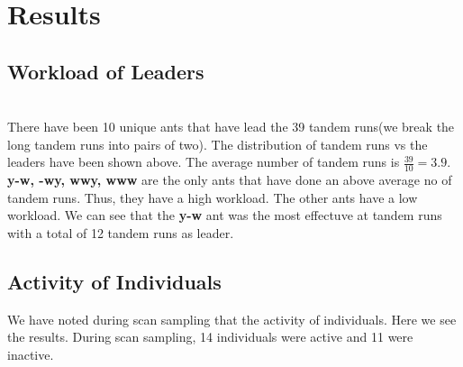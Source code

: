 \documentclass{scrartcl}
\begin{document}
\section{Results}
\subsection{Workload of Leaders}
\\
There have been 10 unique ants that have lead the 39 tandem runs(we break the long tandem runs into 
pairs of two). The distribution of tandem runs vs the leaders have been shown above. The average 
number of tandem runs is \(\frac{39}{10} = 3.9\). \textbf{y-w, -wy, wwy, www} are the only ants that have done 
an above average no of tandem runs. Thus, they have a high workload. The other ants have a low workload. 
We can see that the \textbf{y-w} ant was the most effectuve at tandem runs with a total of 12 tandem runs as leader.

\subsection{Activity of Individuals}
We have noted during scan sampling that the activity of individuals. Here we see the results. During 
scan sampling, 14 individuals were active and 11 were inactive.

\begin{center}
\end{center}
\end{document}
